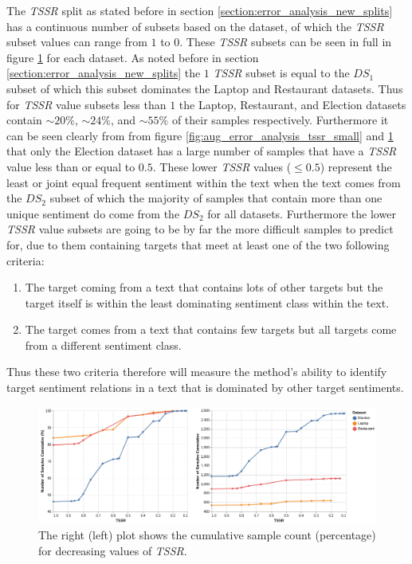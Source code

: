 The \textit{TSSR} split as stated before in section \ref{section:error_analysis_new_splits} has a continuous number of subsets based on the dataset, of which the \textit{TSSR} subset values can range from $1$ to $0$. These \textit{TSSR} subsets can be seen in full in figure \ref{fig:aug_error_analysis_tssr_full} for each dataset. As noted before in section \ref{section:error_analysis_new_splits} the $1$ \textit{TSSR} subset is equal to the $DS_1$ subset of which this subset dominates the Laptop and Restaurant datasets. Thus for \textit{TSSR} value subsets less than $1$ the Laptop, Restaurant, and Election datasets contain $\sim20\%$, $\sim24\%$, and $\sim55\%$ of their samples respectively. Furthermore it can be seen clearly from from figure \ref{fig:aug_error_analysis_tssr_small} and \ref{fig:aug_error_analysis_tssr_full} that only the Election dataset has a large number of samples that have a \textit{TSSR} value less than or equal to $0.5$. These lower \textit{TSSR} values ($\leq 0.5$) represent the least or joint equal frequent sentiment within the text when the text comes from the $DS_2$ subset of which the majority of samples that contain more than one unique sentiment do come from the $DS_2$ for all datasets. Furthermore the lower \textit{TSSR} value subsets are going to be by far the more difficult samples to predict for, due to them containing targets that meet at least one of the two following criteria:
\begin{enumerate}
    \item The target coming from a text that contains lots of other targets but the target itself is within the least dominating sentiment class within the text.
    \item The target comes from a text that contains few targets but all targets come from a different sentiment class.
\end{enumerate}
Thus these two criteria therefore will measure the method's ability to identify target sentiment relations in a text that is dominated by other target sentiments.

\begin{figure}[!ht]
    \centering
    \includegraphics[scale=0.35]{images/augmentation/error_analysis/tssr_full_range.png}
    \caption{The right (left) plot shows the cumulative sample count (percentage) for decreasing values of \textit{TSSR}.}
    \label{fig:aug_error_analysis_tssr_full}
\end{figure}

